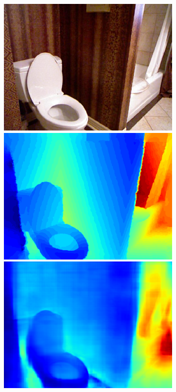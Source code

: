\begin{figure}[htb]
\begin{subfigure}{0.15\linewidth}
  \begin{minipage}[t]{1\linewidth}
  \centering
  \includegraphics[width=1\linewidth]{figure/nyu_rgb/706.png}
  \includegraphics[width=1\linewidth]{figure/nyu_gt/706.png}
  \includegraphics[width=1\linewidth]{figure/nyu_result/bathroom_rgb_00706.png}

\end{minipage}
\end{subfigure}
\end{figure}
